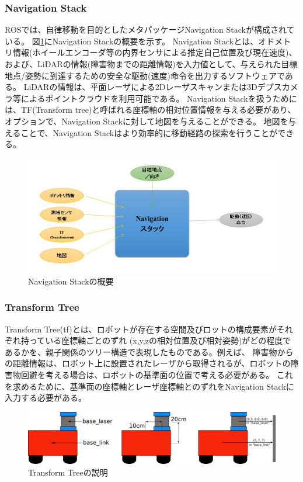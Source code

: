 \subsubsection{Navigation Stack}
ROSでは、自律移動を目的としたメタパッケージNavigation Stack\cite{auto:navstack}が構成されている。
図\ref{auto:navstack:state}にNavigation Stackの概要を示す。
Navigation Stackとは、オドメトリ情報(ホイールエンコーダ等の内界センサによる推定自己位置及び現在速度)、および、LiDARの情報(障害物までの距離情報)を入力値として、与えられた目標地点/姿勢に到達するための安全な駆動(速度)命令を出力するソフトウェアである。
LiDARの情報は、平面レーザによる2Dレーザスキャンまたは3Dデプスカメラ等によるポイントクラウドを利用可能である。
Navigation Stackを扱うためには、TF(Transform tree)と呼ばれる座標軸の相対位置情報を与える必要があり、オプションで、Navigation Stackに対して地図を与えることができる。
地図を与えることで、Navigation Stackはより効率的に移動経路の探索を行うことができる。

\begin{figure}[h]
  \begin{center}
    \includegraphics[width=.6\linewidth]{img/auto_9.jpg}
    \caption{Navigation Stackの概要}
    \label{auto:navstack:state}
  \end{center}
\end{figure}

\subsubsection{Transform Tree}
Transform Tree(tf)とは、ロボットが存在する空間及びロットの構成要素がそれぞれ持っている座標軸ごとのずれ
(x,y,zの相対位置及び相対姿勢)がどの程度であるかを、親子関係のツリー構造で表現したものである。例えば、
障害物からの距離情報は、ロボット上に設置されたレーザから取得されるが、ロボットの障害物回避を考える場合は、ロボットの基準面の位置で考える必要がある。
これを求めるために、基準面の座標軸とレーザ座標軸とのずれをNavigation Stackに入力する必要がある。

\begin{figure}[h]
  \begin{center}
    \includegraphics[width=.8\linewidth]{img/auto_10.jpg}
    \caption{Transform Treeの説明}
    \label{auto:navstack:tf}
  \end{center}
\end{figure}

